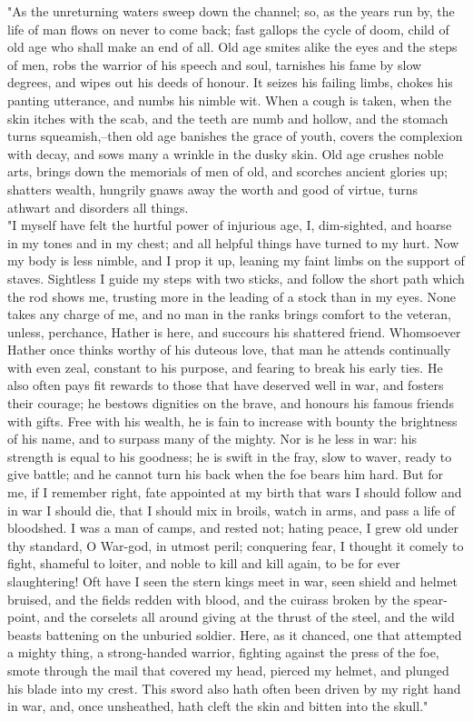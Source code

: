 \documentclass[10pt,a4paper]{report}
\begin{document}
"As the unreturning waters sweep down the channel; so, as the years run by, the life of man flows on never to come back; fast gallops the cycle of doom, child of old age who shall make an end of all. Old age smites alike the eyes and the steps of men, robs the warrior of his speech and soul, tarnishes his fame by slow degrees, and wipes out his deeds of honour. It seizes his failing limbs, chokes his panting utterance, and numbs his nimble wit. When a cough is taken, when the skin itches with the scab, and the teeth are numb and hollow, and the stomach turns squeamish,--then old age banishes the grace of youth, covers the complexion with decay, and sows many a wrinkle in the dusky skin. Old age crushes noble arts, brings down the memorials of men of old, and scorches ancient glories up; shatters wealth, hungrily gnaws away the worth and good of virtue, turns athwart and disorders all things.\\

"I myself have felt the hurtful power of injurious age, I, dim-sighted, and hoarse in my tones and in my chest; and all helpful things have turned to my hurt. Now my body is less nimble, and I prop it up, leaning my faint limbs on the support of staves. Sightless I guide my steps with two sticks, and follow the short path which the rod shows me, trusting more in the leading of a stock than in my eyes. None takes any charge of me, and no man in the ranks brings comfort to the veteran, unless, perchance, Hather is here, and succours his shattered friend. Whomsoever Hather once thinks worthy of his duteous love, that man he attends continually with even zeal, constant to his purpose, and fearing to break his early ties. He also often pays fit rewards to those that have deserved well in war, and fosters their courage; he bestows dignities on the brave, and honours his famous friends with gifts. Free with his wealth, he is fain to increase with bounty the brightness of his name, and to surpass many of the mighty. Nor is he less in war: his strength is equal to his goodness; he is swift in the fray, slow to waver, ready to give battle; and he cannot turn his back when the foe bears him hard. But for me, if I remember right, fate appointed at my birth that wars I should follow and in war I should die, that I should mix in broils, watch in arms, and pass a life of bloodshed. I was a man of camps, and rested not; hating peace, I grew old under thy standard, O War-god, in utmost peril; conquering fear, I thought it comely to fight, shameful to loiter, and noble to kill and kill again, to be for ever slaughtering! Oft have I seen the stern kings meet in war, seen shield and helmet bruised, and the fields redden with blood, and the cuirass broken by the spear-point, and the corselets all around giving at the thrust of the steel, and the wild beasts battening on the unburied soldier. Here, as it chanced, one that attempted a mighty thing, a strong-handed warrior, fighting against the press of the foe, smote through the mail that covered my head, pierced my helmet, and plunged his blade into my crest. This sword also hath often been driven by my right hand in war, and, once unsheathed, hath cleft the skin and bitten into the skull."\\
\end{document}

